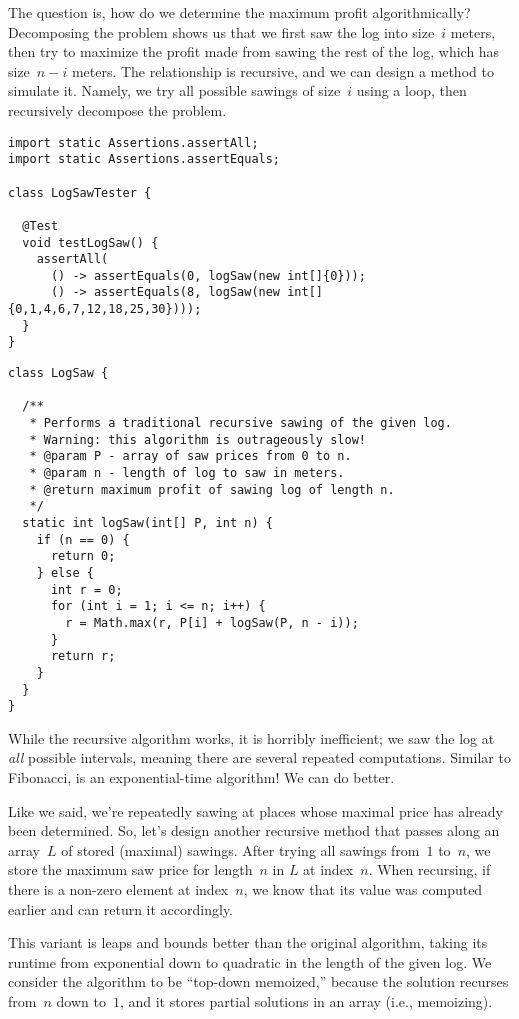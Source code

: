 The question is, how do we determine the maximum profit algorithmically? 
Decomposing the problem shows us that we first saw the log into size~$i$ meters, then try to maximize the profit made from sawing the rest of the log, which has size~$n - i$ meters. 
The relationship is recursive, and we can design a method to simulate it.
Namely, we try all possible sawings of size~$i$ using a loop, then recursively decompose the problem.

\begin{lstlisting}[language=MyJava]
import static Assertions.assertAll;
import static Assertions.assertEquals;

class LogSawTester {

  @Test
  void testLogSaw() {
    assertAll(
      () -> assertEquals(0, logSaw(new int[]{0}));
      () -> assertEquals(8, logSaw(new int[]{0,1,4,6,7,12,18,25,30})));
  }
}
\end{lstlisting}

\begin{lstlisting}[language=MyJava]
class LogSaw {
  
  /**
   * Performs a traditional recursive sawing of the given log.
   * Warning: this algorithm is outrageously slow!
   * @param P - array of saw prices from 0 to n.
   * @param n - length of log to saw in meters.
   * @return maximum profit of sawing log of length n.
   */
  static int logSaw(int[] P, int n) {
    if (n == 0) {
      return 0;
    } else {
      int r = 0;
      for (int i = 1; i <= n; i++) {
        r = Math.max(r, P[i] + logSaw(P, n - i));
      }
      return r;
    }
  }
}
\end{lstlisting}

While the recursive algorithm works, it is horribly inefficient; we saw the log at \emph{all} possible intervals, meaning there are several repeated computations. 
Similar to Fibonacci,  is an exponential-time algorithm! 
We can do better.

Like we said, we're repeatedly sawing at places whose maximal price has already been determined.
So, let's design another recursive method that passes along an array~$L$ of stored (maximal) sawings.
After trying all sawings from~$1$ to~$n$, we store the maximum saw price for length~$n$ in $L$ at index~$n$.
When recursing, if there is a non-zero element at index~$n$, we know that its value was computed earlier and can return it accordingly.

This variant is leaps and bounds better than the original algorithm, taking its runtime from exponential down to quadratic in the length of the given log. 
We consider the algorithm to be ``top-down memoized,'' because the solution recurses from~$n$ down to~$1$, and it stores partial solutions in an array (i.e., memoizing). 


